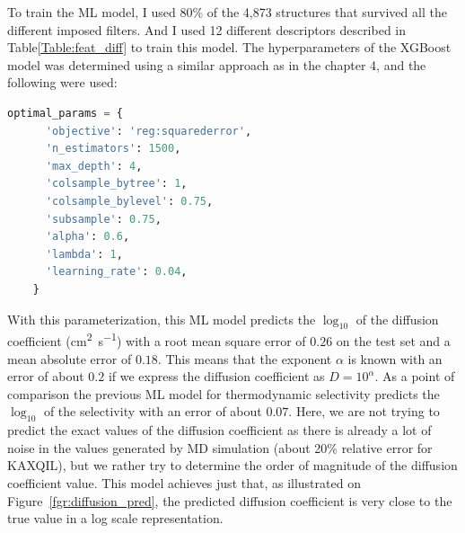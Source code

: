 \documentclass[main]{subfiles}
\begin{document}
To train the ML model, I used {80\%} of the 4,873 structures that survived all the different imposed filters. And I used 12 different descriptors described in Table\ref{Table:feat_diff} to train this model. The hyperparameters of the XGBoost model was determined using a similar approach as in the chapter 4, and the following were used:

\begin{lstlisting}[language=Python]
  optimal_params = {
      'objective': 'reg:squarederror',
      'n_estimators': 1500,
      'max_depth': 4,
      'colsample_bytree': 1,
      'colsample_bylevel': 0.75,
      'subsample': 0.75,
      'alpha': 0.6,
      'lambda': 1,
      'learning_rate': 0.04,
    }
\end{lstlisting}

With this parameterization, this ML model predicts the $\log_{10}$ of the diffusion coefficient (\si{\square\cm\per\s}) with a root mean square error of $0.26$ on the test set and a mean absolute error of $0.18$. This means that the exponent $\alpha$ is known with an error of about $0.2$ if we express the diffusion coefficient as $D = 10^{\alpha}$. As a point of comparison the previous ML model for thermodynamic selectivity predicts the $\log_{10}$ of the selectivity with an error of about $0.07$. Here, we are not trying to predict the exact values of the diffusion coefficient as there is already a lot of noise in the values generated by MD simulation (about {20\% relative error for KAXQIL}), but we rather try to determine the order of magnitude of the diffusion coefficient value. This model achieves just that, as illustrated on Figure~\ref{fgr:diffusion_pred}, the predicted diffusion coefficient is very close to the true value in a log scale representation.
\end{document}
